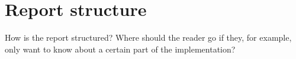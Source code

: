 \section{Report structure}
How is the report structured? Where should the reader go if they, for example, only want to know about a certain part of the implementation?